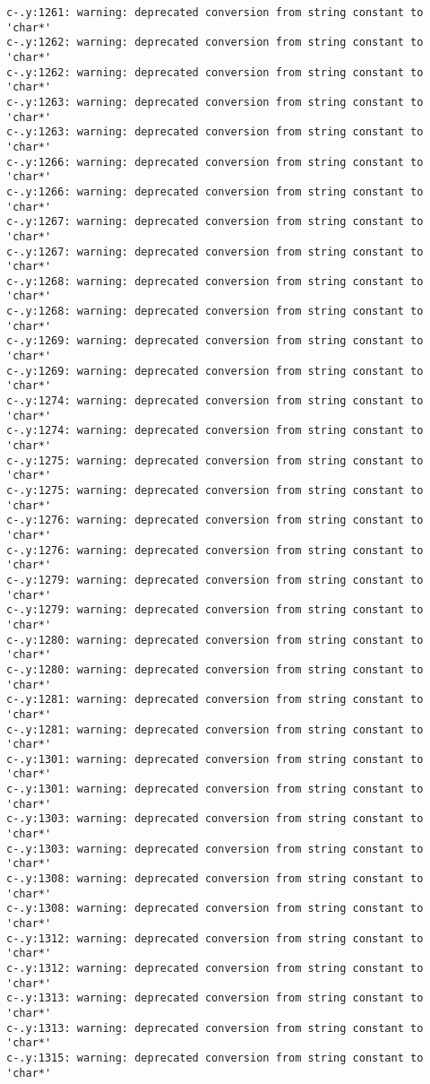 \documentclass[12pt]{book}
\begin{document}
\begin{lstlisting}
c-.y:1261: warning: deprecated conversion from string constant to 'char*'
c-.y:1262: warning: deprecated conversion from string constant to 'char*'
c-.y:1262: warning: deprecated conversion from string constant to 'char*'
c-.y:1263: warning: deprecated conversion from string constant to 'char*'
c-.y:1263: warning: deprecated conversion from string constant to 'char*'
c-.y:1266: warning: deprecated conversion from string constant to 'char*'
c-.y:1266: warning: deprecated conversion from string constant to 'char*'
c-.y:1267: warning: deprecated conversion from string constant to 'char*'
c-.y:1267: warning: deprecated conversion from string constant to 'char*'
c-.y:1268: warning: deprecated conversion from string constant to 'char*'
c-.y:1268: warning: deprecated conversion from string constant to 'char*'
c-.y:1269: warning: deprecated conversion from string constant to 'char*'
c-.y:1269: warning: deprecated conversion from string constant to 'char*'
c-.y:1274: warning: deprecated conversion from string constant to 'char*'
c-.y:1274: warning: deprecated conversion from string constant to 'char*'
c-.y:1275: warning: deprecated conversion from string constant to 'char*'
c-.y:1275: warning: deprecated conversion from string constant to 'char*'
c-.y:1276: warning: deprecated conversion from string constant to 'char*'
c-.y:1276: warning: deprecated conversion from string constant to 'char*'
c-.y:1279: warning: deprecated conversion from string constant to 'char*'
c-.y:1279: warning: deprecated conversion from string constant to 'char*'
c-.y:1280: warning: deprecated conversion from string constant to 'char*'
c-.y:1280: warning: deprecated conversion from string constant to 'char*'
c-.y:1281: warning: deprecated conversion from string constant to 'char*'
c-.y:1281: warning: deprecated conversion from string constant to 'char*'
c-.y:1301: warning: deprecated conversion from string constant to 'char*'
c-.y:1301: warning: deprecated conversion from string constant to 'char*'
c-.y:1303: warning: deprecated conversion from string constant to 'char*'
c-.y:1303: warning: deprecated conversion from string constant to 'char*'
c-.y:1308: warning: deprecated conversion from string constant to 'char*'
c-.y:1308: warning: deprecated conversion from string constant to 'char*'
c-.y:1312: warning: deprecated conversion from string constant to 'char*'
c-.y:1312: warning: deprecated conversion from string constant to 'char*'
c-.y:1313: warning: deprecated conversion from string constant to 'char*'
c-.y:1313: warning: deprecated conversion from string constant to 'char*'
c-.y:1315: warning: deprecated conversion from string constant to 'char*'

\end{lstlisting}
\end{document}

